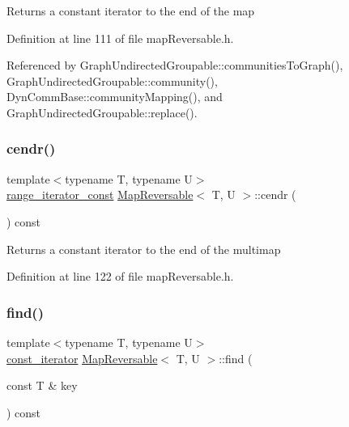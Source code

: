 \begin{DoxyReturn}{Returns}
a constant iterator to the end of the map 
\end{DoxyReturn}


Definition at line 111 of file map\+Reversable.\+h.



Referenced by Graph\+Undirected\+Groupable\+::communities\+To\+Graph(), Graph\+Undirected\+Groupable\+::community(), Dyn\+Comm\+Base\+::community\+Mapping(), and Graph\+Undirected\+Groupable\+::replace().

\mbox{\label{classMapReversable_ada3c47662db8789525f572dabe378244}} 
\subsubsection{\texorpdfstring{cendr()}{cendr()}}
{\footnotesize\ttfamily template$<$typename T, typename U$>$ \\
\hyperlink{classMapReversable_aed8c3cc9e7a8601664db79d56d117adf}{range\+\_\+iterator\+\_\+const} \hyperlink{classMapReversable}{Map\+Reversable}$<$ T, U $>$\+::cendr (\begin{DoxyParamCaption}{ }\end{DoxyParamCaption}) const\hspace{0.3cm}{\ttfamily [inline]}}

\begin{DoxyReturn}{Returns}
a constant iterator to the end of the multimap 
\end{DoxyReturn}


Definition at line 122 of file map\+Reversable.\+h.

\mbox{\label{classMapReversable_a30fd5b0e4e2578d3eaad8926a5d12cb2}} 
\subsubsection{\texorpdfstring{find()}{find()}}
{\footnotesize\ttfamily template$<$typename T, typename U$>$ \\
\hyperlink{classMapReversable_a7a41e7d60ba284a59e7bf76c8c53e9c2}{const\+\_\+iterator} \hyperlink{classMapReversable}{Map\+Reversable}$<$ T, U $>$\+::find (\begin{DoxyParamCaption}\item[{const T \&}]{key }\end{DoxyParamCaption}) const\hspace{0.3cm}{\ttfamily [inline]}}

